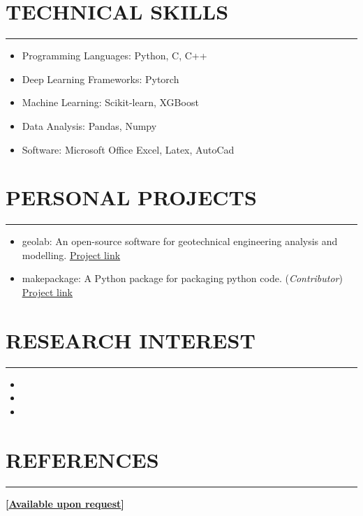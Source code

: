 \documentclass[letterpaper, 12pt]{article}
\newcommand{\cvsection}[1]{
	
	\section*{#1}	
	\rule[20pt]{\linewidth}{0.5pt} %

}
\newcommand{\itemizeMargin}{11pt}
\begin{document}
	
	\cvsection{TECHNICAL SKILLS}
	
	\begin{itemize}[leftmargin=\itemizeMargin]
		
		\item Programming Languages: Python, C, C++
		\item Deep Learning Frameworks: Pytorch
		\item Machine Learning: Scikit-learn, XGBoost
		\item Data Analysis: Pandas, Numpy
		\item Software: Microsoft Office Excel, Latex, AutoCad
		
	\end{itemize}
	
	
	\cvsection{PERSONAL PROJECTS}
	
	\begin{itemize}[leftmargin=\itemizeMargin]
		
		\item geolab: An open-source software for geotechnical engineering analysis and modelling. \href{https://www.github.com/patrickboateng/geolab}{\underline{Project link}}
		
		\item makepackage: A Python package for packaging python code. (\textit{Contributor})
		\href{https://github.com/nyggus/makepackage}{\underline{Project link}}
		
	\end{itemize}
	
	
	\cvsection{RESEARCH INTEREST}
	
	\begin{itemize}[leftmargin=\itemizeMargin]
		
		\item 
		\item 
		\item 
		
	\end{itemize}
	
	
	\cvsection{REFERENCES}
	
	\textbf{[\href{mailto:boatengpatrick456@gmail.com}{\underline{Available upon request}}]}
	
\end{document}
